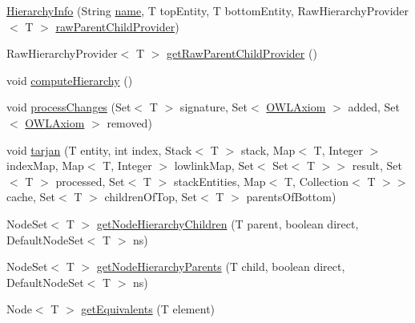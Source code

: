 \begin{DoxyCompactItemize}
\item 
\hyperlink{classorg_1_1semanticweb_1_1owlapi_1_1reasoner_1_1structural_1_1_structural_reasoner_1_1_hierarch7d8ade138c58c437609a51314b153fe1_ad18275796d0f9469415216ee563f2b83}{Hierarchy\-Info} (String \hyperlink{classorg_1_1semanticweb_1_1owlapi_1_1reasoner_1_1structural_1_1_structural_reasoner_1_1_hierarch7d8ade138c58c437609a51314b153fe1_ad1112099a477ba419c5fd321ee18254c}{name}, T top\-Entity, T bottom\-Entity, Raw\-Hierarchy\-Provider$<$ T $>$ \hyperlink{classorg_1_1semanticweb_1_1owlapi_1_1reasoner_1_1structural_1_1_structural_reasoner_1_1_hierarch7d8ade138c58c437609a51314b153fe1_a8c9b9e46034c5a8ed13b731f455d22b5}{raw\-Parent\-Child\-Provider})
\item 
Raw\-Hierarchy\-Provider$<$ T $>$ \hyperlink{classorg_1_1semanticweb_1_1owlapi_1_1reasoner_1_1structural_1_1_structural_reasoner_1_1_hierarch7d8ade138c58c437609a51314b153fe1_af68737e7693e95132f7bc45c85136459}{get\-Raw\-Parent\-Child\-Provider} ()
\item 
void \hyperlink{classorg_1_1semanticweb_1_1owlapi_1_1reasoner_1_1structural_1_1_structural_reasoner_1_1_hierarch7d8ade138c58c437609a51314b153fe1_a2fdb39438c76ca6aa03b3676a0b18602}{compute\-Hierarchy} ()
\item 
void \hyperlink{classorg_1_1semanticweb_1_1owlapi_1_1reasoner_1_1structural_1_1_structural_reasoner_1_1_hierarch7d8ade138c58c437609a51314b153fe1_afab9df4b05d63d4b16cb57c7d22bd7bd}{process\-Changes} (Set$<$ T $>$ signature, Set$<$ \hyperlink{interfaceorg_1_1semanticweb_1_1owlapi_1_1model_1_1_o_w_l_axiom}{O\-W\-L\-Axiom} $>$ added, Set$<$ \hyperlink{interfaceorg_1_1semanticweb_1_1owlapi_1_1model_1_1_o_w_l_axiom}{O\-W\-L\-Axiom} $>$ removed)
\item 
void \hyperlink{classorg_1_1semanticweb_1_1owlapi_1_1reasoner_1_1structural_1_1_structural_reasoner_1_1_hierarch7d8ade138c58c437609a51314b153fe1_af5604a6e71ad518720f39940ca690b66}{tarjan} (T entity, int index, Stack$<$ T $>$ stack, Map$<$ T, Integer $>$ index\-Map, Map$<$ T, Integer $>$ lowlink\-Map, Set$<$ Set$<$ T $>$$>$ result, Set$<$ T $>$ processed, Set$<$ T $>$ stack\-Entities, Map$<$ T, Collection$<$ T $>$$>$ cache, Set$<$ T $>$ children\-Of\-Top, Set$<$ T $>$ parents\-Of\-Bottom)
\item 
Node\-Set$<$ T $>$ \hyperlink{classorg_1_1semanticweb_1_1owlapi_1_1reasoner_1_1structural_1_1_structural_reasoner_1_1_hierarch7d8ade138c58c437609a51314b153fe1_af0fa6cc534abebb6f1a4260f94d63038}{get\-Node\-Hierarchy\-Children} (T parent, boolean direct, Default\-Node\-Set$<$ T $>$ ns)
\item 
Node\-Set$<$ T $>$ \hyperlink{classorg_1_1semanticweb_1_1owlapi_1_1reasoner_1_1structural_1_1_structural_reasoner_1_1_hierarch7d8ade138c58c437609a51314b153fe1_a5e66dab0fdac68d3b114650f2b64e63c}{get\-Node\-Hierarchy\-Parents} (T child, boolean direct, Default\-Node\-Set$<$ T $>$ ns)
\item 
Node$<$ T $>$ \hyperlink{classorg_1_1semanticweb_1_1owlapi_1_1reasoner_1_1structural_1_1_structural_reasoner_1_1_hierarch7d8ade138c58c437609a51314b153fe1_adac852cb5a7edb8a0b69d637e3d59450}{get\-Equivalents} (T element)
\end{DoxyCompactItemize}
